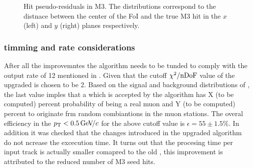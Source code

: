 \begin{figure}[t]
  \centering
  \begin{subfigure}{0.5\textwidth}
    \scalebox{.6}{}
    \caption{}
    \label{mvTTm_res_x}
  \end{subfigure}%
  \hfill%
  \begin{subfigure}{0.5\textwidth}
    \scalebox{.6}{}
    \caption{}
    \label{mvm_res_y}
  \end{subfigure}
  \caption{Hit pseudo-residuals in M3. The distributions correspond to the distnace between the center of the FoI and the true M3 hit
           in the $x$ (left) and $y$ (right) planes respectively.}
 \label{mvm_res}
\end{figure}

\subsubsection{\hltone timming and rate considerations}
After all the improvemntes the \mvTTm algorithm needs to be tunded to comply with the \hltone output rate of 12
\khz mentioned in . Given that the cutoff $\chi^2/{\rm nDoF}$ value of the upgraded \mvTTm is chosen to be 2.
Based on the signal and background distributions of , the last value imples that a \veloTrack which
is accepted by the \mvTTm algorithm has {\color{red} X (to be computed)} percent probability of being
a real muon and {\color{red} Y (to be computed)} percent to originate frm random combiantions in the muon stations. The overal \mvTTm efficiency in the $\mbox{$p_{\rm T}$}<0.5{\mathrm{\,Ge\kern -0.1em V\!/}c}$
for the above cutoff value is $\epsilon = 55 \pm 1.5 \%$. In addition it was checked that the changes introduced in the upgraded \mvTTm algorithm
do not ncrease the excecution time. It turns out that the procesing time per input track is actually smaller comapred to
the old \mvm, this improvement is attributed to the reduced number of M3 seed hits.

